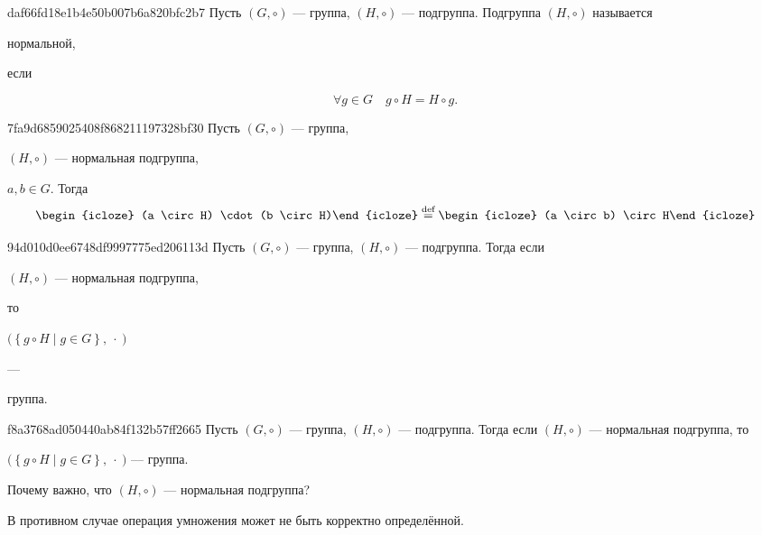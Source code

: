 \begin{note}{daf66fd18e1b4e50b007b6a820bfc2b7}
    Пусть \({ (G, \circ) }\) --- группа, \({ (H, \circ) }\) --- подгруппа.
    Подгруппа \({ (H, \circ) }\) называется \begin{icloze}{2}нормальной,\end{icloze} если
    \begin{icloze}{1}
        \[
            \forall g \in G  \quad g \circ H = H \circ g.
        \]
    \end{icloze}
\end{note}

\begin{note}{7fa9d6859025408f868211197328bf30}
    Пусть \({ (G, \circ) }\) ---  группа, \begin{icloze}{3}\({ (H, \circ) }\) --- нормальная подгруппа,\end{icloze}\: \({ a, b \in G }\).
    Тогда
    \[
        \begin{icloze}{2}(a \circ H) \cdot (b \circ H)\end{icloze} \overset{\text{def}}= \begin{icloze}{1}(a \circ b) \circ H\end{icloze}
    \]
\end{note}

\begin{note}{94d010d0ee6748df9997775ed206113d}
    Пусть \({ (G, \circ) }\) --- группа, \({ (H, \circ) }\) --- подгруппа.
    Тогда если \begin{icloze}{3}\({ (H, \circ) }\) --- нормальная подгруппа,\end{icloze} то
    \begin{center}
        \begin{icloze}{2}\({ \big(\left\{ g \circ H \mid g \in G \right\}, \:\cdot\:\big) }\)\end{icloze} --- \begin{icloze}{1}группа.\end{icloze}
    \end{center}
\end{note}

\begin{note}{f8a3768ad050440ab84f132b57ff2665}
    Пусть \({ (G, \circ) }\) --- группа, \({ (H, \circ) }\) --- подгруппа.
    Тогда если \({ (H, \circ) }\) --- нормальная подгруппа, то
    \begin{center}
        \({ \big(\left\{ g \circ H \mid g \in G \right\}, \:\cdot\:\big) }\) --- группа.
    \end{center}
    Почему важно, что \({ (H, \circ) }\) --- нормальная подгруппа?

    \begin{cloze}{1}
        В противном случае операция умножения может не быть корректно определённой.
    \end{cloze}
\end{note}

